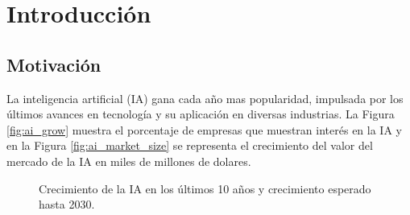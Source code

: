 \chapter{Introducción}

\section{Motivación}

La inteligencia artificial (IA) gana cada año mas popularidad, impulsada por los últimos avances en tecnología y su aplicación en diversas industrias. La Figura \ref{fig:ai_grow} muestra el porcentaje de empresas que muestran interés en la IA y en la Figura \ref{fig:ai_market_size} se representa el crecimiento del valor del mercado de la IA en miles de millones de dolares.

\begin{figure}[htb]
  \begin{subcaptiongroup}
  \begin{floatrow}
  \end{floatrow}
  \end{subcaptiongroup}
  \caption{Crecimiento de la IA en los últimos 10 años y crecimiento esperado hasta 2030.}%
\end{figure}

